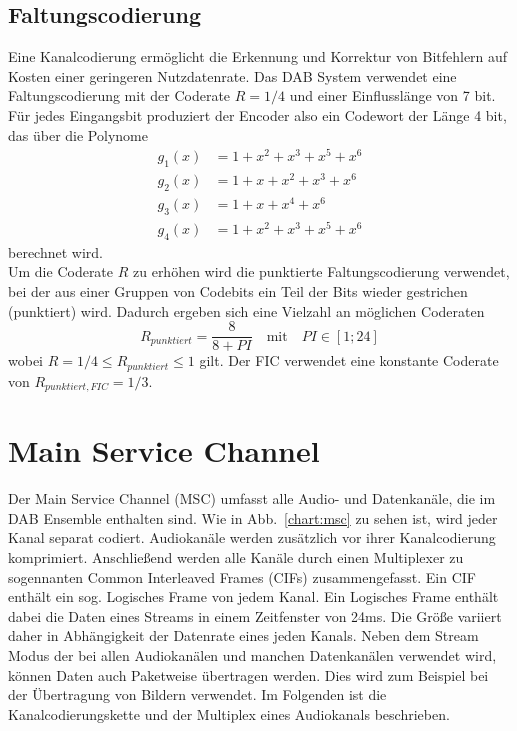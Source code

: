 \subsection{Faltungscodierung}
\label{sec:faltungscodierung}
Eine Kanalcodierung ermöglicht die Erkennung und Korrektur von Bitfehlern auf Kosten einer geringeren Nutzdatenrate. Das DAB System verwendet eine Faltungscodierung mit der Coderate $R=1/4$ und einer Einflusslänge von 7 bit. Für jedes Eingangsbit produziert der Encoder also ein Codewort der Länge 4 bit, das über die Polynome
\begin{equation}
\begin{aligned}
g_1(x) &= 1 + x^2 + x^3 + x^5 + x^6 \\
g_2(x) &= 1 + x + x^2 + x^3 + x^6 \\
g_3(x) &= 1 + x + x^4 + x^6 \\
g_4(x) &= 1 + x^2 + x^3 + x^5 + x^6
\end{aligned}
\end{equation}
berechnet wird. \\
Um die Coderate $R$ zu erhöhen wird die punktierte Faltungscodierung verwendet, bei der aus einer Gruppen von Codebits ein Teil der Bits wieder gestrichen (punktiert) wird. Dadurch ergeben sich eine Vielzahl an möglichen Coderaten
\begin{equation}
R_{punktiert} = \frac{8}{8 + PI} \quad \text{mit} \quad PI \in [1;24]
\end{equation}
wobei $R = 1/4 \leq R_{punktiert} \leq 1$ gilt. Der FIC verwendet eine konstante Coderate von $R_{punktiert, FIC} = 1/3$.

\section{Main Service Channel}
Der Main Service Channel (MSC) umfasst alle Audio- und Datenkanäle, die im DAB Ensemble enthalten sind. Wie in Abb.~\ref{chart:msc} zu sehen ist, wird jeder Kanal separat codiert. Audiokanäle werden zusätzlich vor ihrer Kanalcodierung komprimiert. Anschließend werden alle Kanäle durch einen Multiplexer zu sogennanten Common Interleaved Frames (CIFs) zusammengefasst. Ein CIF enthält ein sog. Logisches Frame von jedem Kanal. Ein Logisches Frame enthält dabei die Daten eines Streams in einem Zeitfenster von 24ms. Die Größe variiert daher in Abhängigkeit der Datenrate eines jeden Kanals.  Neben dem Stream Modus der bei allen Audiokanälen und manchen Datenkanälen verwendet wird, können Daten auch Paketweise übertragen werden. Dies wird zum Beispiel bei der Übertragung von Bildern verwendet. Im Folgenden ist die Kanalcodierungskette und der Multiplex eines Audiokanals beschrieben.


